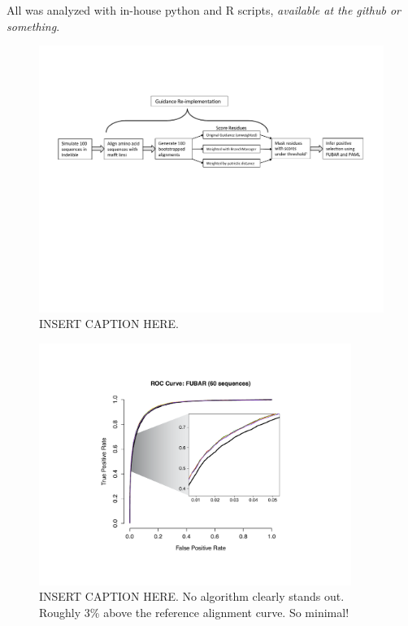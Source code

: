 \documentclass[10pt]{article}
\begin{document}
All was analyzed with in-house python and R scripts, \textit{available at the github or something}.


\begin{figure}[H]
\centerline{\includegraphics[width=7.5in]{Figures/pipeline.pdf}}
\caption{INSERT CAPTION HERE.}
\label{pipeline} 
\end{figure}

\begin{figure}[H]
\centerline{\includegraphics[width=4in]{Figures/fubar_inset_ROC.pdf}}
\caption{INSERT CAPTION HERE. No algorithm clearly stands out. Roughly 3\% above the reference alignment curve. So minimal!}
\label{rocfubar60} 
\end{figure}




	
\end{document}
